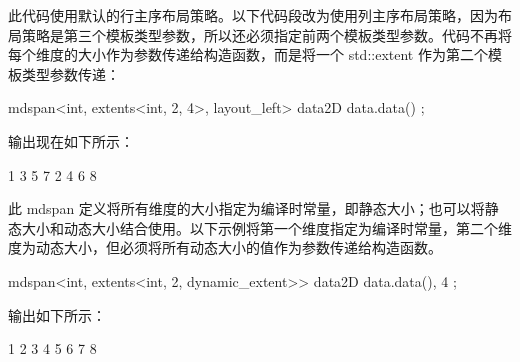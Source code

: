 此代码使用默认的行主序布局策略。以下代码段改为使用列主序布局策略，因为布局策略是第三个模板类型参数，所以还必须指定前两个模板类型参数。代码不再将每个维度的大小作为参数传递给构造函数，而是将一个 std::extent 作为第二个模板类型参数传递：

\begin{cpp}
mdspan<int, extents<int, 2, 4>, layout_left> data2D { data.data() };
\end{cpp}

输出现在如下所示：

\begin{shell}
1 3 5 7
2 4 6 8
\end{shell}

此 mdspan 定义将所有维度的大小指定为编译时常量，即静态大小；也可以将静态大小和动态大小结合使用。以下示例将第一个维度指定为编译时常量，第二个维度为动态大小，但必须将所有动态大小的值作为参数传递给构造函数。

\begin{cpp}
mdspan<int, extents<int, 2, dynamic_extent>> data2D { data.data(), 4 };
\end{cpp}

输出如下所示：

\begin{shell}
1 2 3 4
5 6 7 8
\end{shell}













